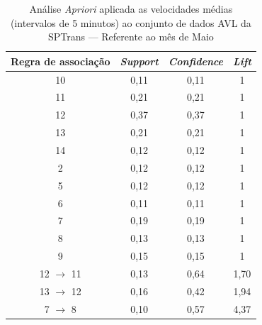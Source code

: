 \documentclass[
	12pt,				%
	oneside,			%
	a4paper,			%
	english,			%
	brazil				%
	]{abntex2ppgsi}
\begin{document}
{{\begin{apendicesenv}
\begin{table}[!htb]
\centering
\caption {Análise \textit{Apriori} aplicada as velocidades médias (intervalos de 5 minutos) ao conjunto de dados AVL da SPTrans --- Referente ao mês de Maio}
\label {tab:aprioriMay}
\begin{tabular}{c|c|c|c}
\toprule
\textbf{Regra de associação} & \textit{\textbf{Support}} & \textit{\textbf{Confidence}} & \textit{\textbf{Lift}} \\
\midrule
10 &  0,11 &  0,11 &  1\\
\hline
11 &  0,21 &  0,21 &  1\\
\hline
12 &  0,37 &  0,37 &  1\\
\hline
13 &  0,21 &  0,21 &  1\\
\hline
14 &  0,12 &  0,12 &  1\\
\hline
2 &  0,12 &  0,12 &  1\\
\hline
5 &  0,12 &  0,12 &  1\\
\hline
6 &  0,11 &  0,11 &  1\\
\hline
7 &  0,19 &  0,19 &  1\\
\hline
8 &  0,13 &  0,13 &  1\\
\hline
9 &  0,15 &  0,15 &  1\\
\hline
12 $\rightarrow$ 11 &  0,13 &  0,64 &  1,70\\
\hline
13 $\rightarrow$ 12 &  0,16 &  0,42 &  1,94\\
\hline
7 $\rightarrow$ 8 &  0,10 &  0,57 &  4,37\\
\bottomrule
\end{tabular}
\end{table}


\end{apendicesenv}}}
\end{document}
